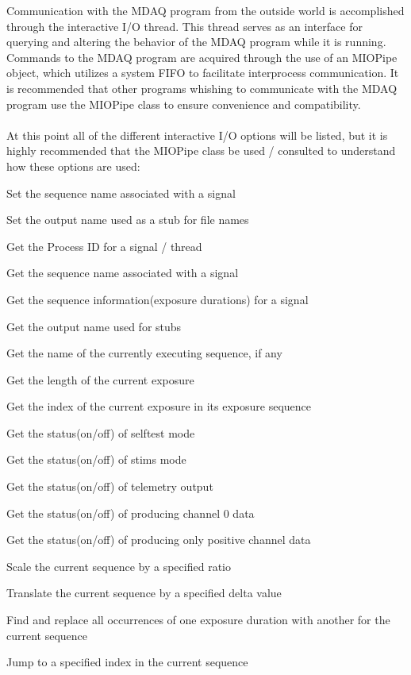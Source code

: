 Communication with the MDAQ program from the outside world is accomplished through the
interactive I/O thread. This thread serves as an interface for querying and altering
the behavior of the MDAQ program while it is running. Commands to the MDAQ program
are acquired through the use of an MIOPipe object, which utilizes a system FIFO to
facilitate interprocess communication. It is recommended that other programs whishing
to communicate with the MDAQ program use the MIOPipe class to ensure convenience and
compatibility.\\
\\
At this point all of the different interactive I/O options will be listed, but it is
highly recommended that the MIOPipe class be used / consulted to understand how these
options are used:
\begin{list}{}{}
\item Set the sequence name associated with a signal
\item Set the output name used as a stub for file names
\item Get the Process ID for a signal / thread
\item Get the sequence name associated with a signal
\item Get the sequence information(exposure durations) for a signal
\item Get the output name used for stubs
\item Get the name of the currently executing sequence, if any
\item Get the length of the current exposure
\item Get the index of the current exposure in its exposure sequence
\item Get the status(on/off) of selftest mode
\item Get the status(on/off) of stims mode
\item Get the status(on/off) of telemetry output
\item Get the status(on/off) of producing channel 0 data
\item Get the status(on/off) of producing only positive channel data
\item Scale the current sequence by a specified ratio
\item Translate the current sequence by a specified delta value
\item Find and replace all occurrences of one exposure duration with another for the current sequence
\item Jump to a specified index in the current sequence

\end{list}
